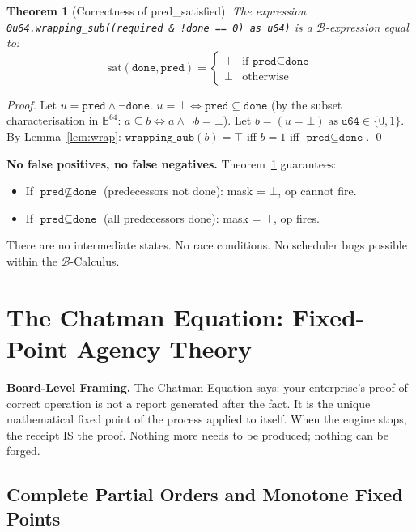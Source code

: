 \documentclass[12pt,a4paper]{article}
\newtheorem{theorem}{Theorem}[section]
\theoremstyle{definition}
\theoremstyle{remark}
\newcommand{\B}{\mathbb{B}}
\newcommand{\dnmask}{\texttt{done}}
\newcommand{\pred}{\texttt{pred}}
\newcommand{\execinsight}[2]{%
  \begin{execbox}
    \textbf{\color{chatblue}#1}\quad #2
  \end{execbox}}
\begin{document}
\begin{theorem}[Correctness of pred\_satisfied]
\label{thm:predsatcorrect}
The expression \lstinline|0u64.wrapping_sub((required & !done == 0) as u64)|
is a $\mathcal{B}$-expression equal to:
\[
  \mathrm{sat}(\dnmask,\pred) =
  \begin{cases}
    \top & \text{if } \pred \subseteq \dnmask \\
    \bot & \text{otherwise}
  \end{cases}
\]
\end{theorem}
\begin{proof}
Let $u = \pred \wedge \neg\dnmask$.
$u = \bot \iff \pred \subseteq \dnmask$ (by the subset characterisation in $\B^{64}$:
$a \subseteq b \iff a \wedge \neg b = \bot$).
Let $b = (u = \bot)\;\text{as}\;\texttt{u64} \in \{0,1\}$.
By Lemma~\ref{lem:wrap}: $\texttt{wrapping\_sub}(b) = \top$ iff $b=1$ iff
$\pred \subseteq \dnmask$. \qed
\end{proof}

\begin{claimbox}
\textbf{No false positives, no false negatives.}
Theorem~\ref{thm:predsatcorrect} guarantees:
\begin{itemize}[noitemsep]
  \item If $\pred \not\subseteq \dnmask$ (predecessors not done): mask = $\bot$, op cannot fire.
  \item If $\pred \subseteq \dnmask$ (all predecessors done): mask = $\top$, op fires.
\end{itemize}
There are no intermediate states. No race conditions. No scheduler bugs possible
within the $\mathcal{B}$-Calculus.
\end{claimbox}

\section{The Chatman Equation: Fixed-Point Agency Theory}
\label{sec:chatman}

\execinsight{Board-Level Framing.}{%
The Chatman Equation says: your enterprise's proof of correct operation is not a report
generated after the fact. It is the unique mathematical fixed point of the process
applied to itself. When the engine stops, the receipt IS the proof.
Nothing more needs to be produced; nothing can be forged.}

\subsection{Complete Partial Orders and Monotone Fixed Points}
\end{document}
